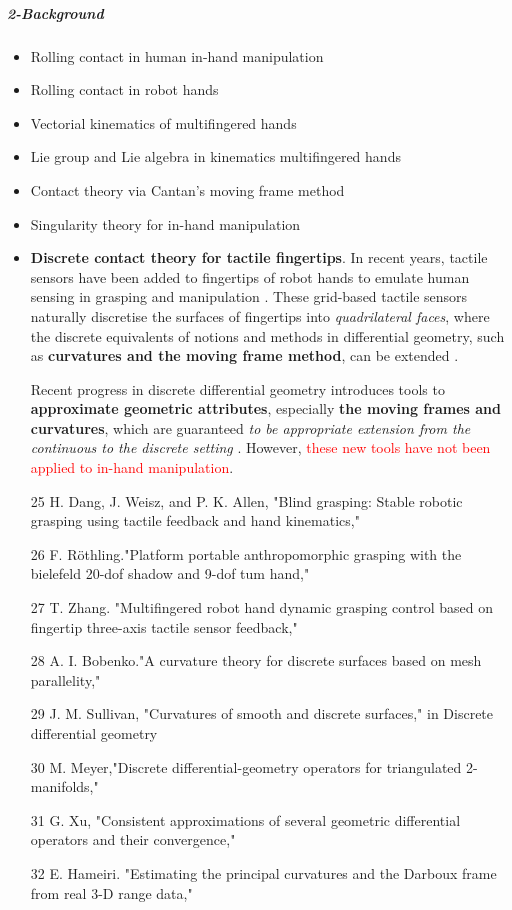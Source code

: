 \subparagraph{2-Background}
\begin{itemize}
\item Rolling contact in human in-hand manipulation
\item Rolling contact in robot hands
\item Vectorial kinematics of multifingered hands
\item Lie group and Lie algebra in kinematics multifingered hands
\item Contact theory via Cantan’s moving frame method
\item Singularity theory for in-hand manipulation
\item \textbf{Discrete contact theory for tactile fingertips}. In recent years, tactile sensors have been added to fingertips of robot hands to emulate human sensing in grasping and manipulation \cite{Lei-Bagnell12_Tactile_Autonomous, HaoDang11_Tactile_BlindGrasping, Rothling07_Dex.Manipulators_Tactile, Zhang14_Tactile_DynamicGrasping}. These grid-based tactile sensors naturally discretise the surfaces of fingertips into \emph{quadrilateral faces}, where the discrete equivalents of notions and methods in differential geometry, such as \textbf{curvatures and the moving frame method}, can be extended \cite{Bobenko10_Discrete_Curvature, Sullivan08_Curvature_DiscreteSurface}. 

Recent progress in discrete differential geometry introduces tools to \textbf{approximate geometric attributes}, especially \textbf{the moving frames and curvatures}, which are guaranteed \emph{to be appropriate extension from the continuous to the discrete setting} \cite{Meyer03_Discrete_Diff.Geo_2Manifolds, Xu13_Geo.Diff_Discrete, Hameiri03_Darboux_Curvature_Discrete}. However, \textcolor{red}{these new tools have not been applied to in-hand manipulation}.
\end{itemize}



\begin{itemize}
\item [25] H. Dang, J. Weisz, and P. K. Allen, "Blind grasping: Stable robotic grasping using tactile feedback and hand kinematics,"
\item [26] F. Röthling."Platform portable anthropomorphic grasping with the bielefeld 20-dof shadow and 9-dof tum hand," 
\item [27] T. Zhang. "Multifingered robot hand dynamic grasping control based on fingertip three-axis tactile sensor feedback," 
\item [28] A. I. Bobenko."A curvature theory for discrete surfaces based on mesh parallelity,"
\item [29] J. M. Sullivan, "Curvatures of smooth and discrete surfaces," in Discrete differential geometry
\item [30] M. Meyer,"Discrete differential-geometry operators for triangulated 2-manifolds," 
\item [31] G. Xu, "Consistent approximations of several geometric differential operators and their convergence,"
\item [32] E. Hameiri. "Estimating the principal curvatures and the Darboux frame from real 3-D range data,"
\end{itemize}

